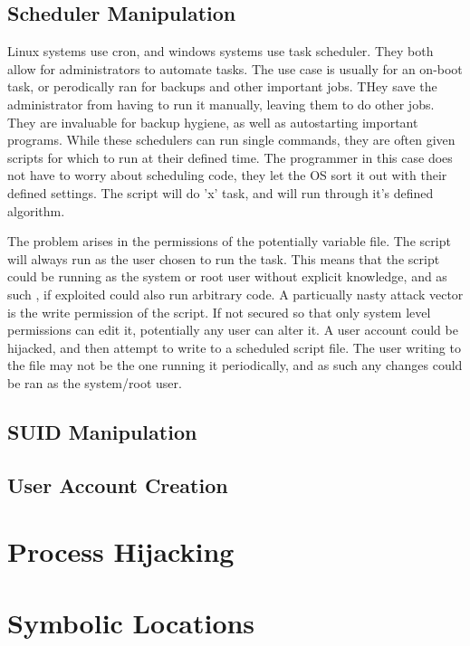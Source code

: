 \subsection{Scheduler Manipulation}
Linux systems use cron, and windows systems use task scheduler. They both allow for administrators to automate tasks. The use case is usually for an on-boot task, or perodically ran for backups and other important jobs.
THey save the administrator from having to run it manually, leaving them to do other jobs. They are invaluable for backup hygiene, as well as autostarting important programs. While these schedulers can run single commands, 
they are often given scripts for which to run at their defined time. The programmer in this case does not have to worry about scheduling code, they let the OS sort it out with their defined settings. The script will do 'x'
task, and will run through it's defined algorithm. 

The problem arises in the permissions of the potentially variable file. The script will always run as the user chosen to run the task. This means that the script could be running as the system or root user without explicit knowledge, and as such
, if exploited could also run arbitrary code. A particually nasty attack vector is the write permission of the script. If not secured so that only system level permissions can edit it, potentially any user can alter it.
A user account could be hijacked, and then attempt to write to a scheduled script file. The user writing to the file may not be the one running it periodically, and as such any changes could be ran as the system/root user.


\subsection{SUID Manipulation}

\subsection{User Account Creation}
\section{Process Hijacking}

\section{Symbolic Locations}

